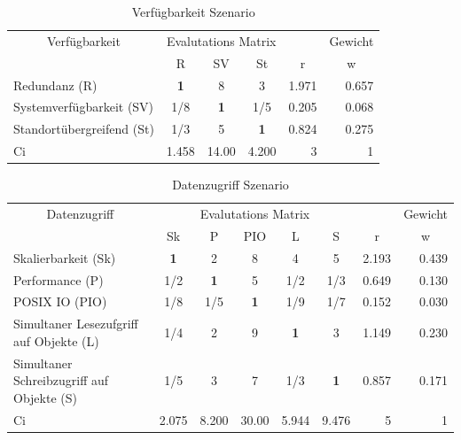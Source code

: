 \begin{table}[htbp]
\caption{Verfügbarkeit Szenario}
\begin{tabular}{|p{7.1cm}|c|c|c|r|r|}
\hline
\multicolumn{ 1}{|c|}{Verfügbarkeit} & \multicolumn{ 3}{c|}{Evalutations Matrix} & \multicolumn{1}{l|}{} & \multicolumn{1}{l|}{Gewicht} \\ \cline{ 2- 6}
\multicolumn{ 1}{|c|}{} & R & SV & St & \multicolumn{1}{c|}{r} & \multicolumn{1}{c|}{w} \\ \hline
Redundanz (R) & \textbf{1    } & 8     & 3     & 1.971 & 0.657 \\ \hline
Systemverfügbarkeit (SV) &  1/8 & \textbf{1} &  1/5 & 0.205 & 0.068 \\ \hline
Standortübergreifend (St) &  1/3 & 5     & \textbf{1} & 0.824 & 0.275 \\ \hline \hline
Ci & \multicolumn{1}{r|}{1.458} & \multicolumn{1}{r|}{14.00} & \multicolumn{1}{r|}{4.200} & 3 & 1 \\ \hline
\end{tabular}
\label{AHPVerfügbarkeitS}
\end{table}


\begin{table}[htbp]
\caption{Datenzugriff Szenario}
\begin{tabular}{|p{4.5cm}|c|c|c|c|c|r|r|}
\hline
\multicolumn{ 1}{|c|}{Datenzugriff} & \multicolumn{ 5}{c|}{Evalutations Matrix} & \multicolumn{1}{l|}{} & \multicolumn{1}{l|}{Gewicht} \\ \cline{ 2- 8}
\multicolumn{ 1}{|c|}{} & Sk & P & PIO  & L & S & \multicolumn{1}{c|}{r} & \multicolumn{1}{c|}{w} \\ \hline
Skalierbarkeit (Sk) & \textbf{1} & 2 & 8 & 4 & 5 & 2.193 & 0.439 \\ \hline
Performance (P) &  1/2 & \textbf{1} & 5 &  1/2 &  1/3 & 0.649 & 0.130 \\ \hline
POSIX IO (PIO) &  1/8 &  1/5 & \textbf{1} &  1/9 &  1/7 & 0.152 & 0.030 \\ \hline
Simultaner Lesezufgriff 
auf Objekte (L) &  1/4 & 2 & 9 & \textbf{1} & 3 & 1.149 & 0.230 \\ \hline
Simultaner Schreibzugriff
 auf Objekte (S) &  1/5 & 3 & 7 &  1/3 & \textbf{1} & 0.857 & 0.171 \\ \hline \hline
Ci & \multicolumn{1}{r|}{2.075} & \multicolumn{1}{r|}{8.200} & \multicolumn{1}{r|}{30.00} & \multicolumn{1}{r|}{5.944} & \multicolumn{1}{r|}{9.476} & 5 & 1 \\ \hline
\end{tabular}
\label{AHPDatenzugriffS}
\end{table}

